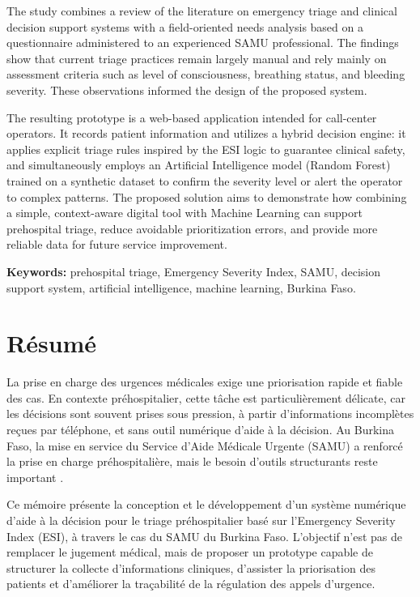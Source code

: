 \documentclass[a4paper,12pt,oneside]{report}
\begin{document}
The study combines a review of the literature on emergency triage and clinical decision support systems with a field-oriented needs analysis based on a questionnaire administered to an experienced SAMU professional. The findings show that current triage practices remain largely manual and rely mainly on assessment criteria such as level of consciousness, breathing status, and bleeding severity. These observations informed the design of the proposed system.

The resulting prototype is a web-based application intended for call-center operators. It records patient information and utilizes a hybrid decision engine: it applies explicit triage rules inspired by the ESI logic to guarantee clinical safety, and simultaneously employs an Artificial Intelligence model (Random Forest) trained on a synthetic dataset to confirm the severity level or alert the operator to complex patterns. The proposed solution aims to demonstrate how combining a simple, context-aware digital tool with Machine Learning can support prehospital triage, reduce avoidable prioritization errors, and provide more reliable data for future service improvement.

\vspace{0.5cm}
\noindent\textbf{Keywords:} prehospital triage, Emergency Severity Index, SAMU, decision support system, artificial intelligence, machine learning, Burkina Faso.

\clearpage

\section*{R\'esum\'e}
\justifying

La prise en charge des urgences m\'edicales exige une priorisation rapide et fiable des cas. En contexte pr\'ehospitalier, cette t\^ache est particuli\`erement d\'elicate, car les d\'ecisions sont souvent prises sous pression, \`a partir d'informations incompl\`etes re\c{c}ues par t\'el\'ephone, et sans outil num\'erique d'aide \`a la d\'ecision. Au Burkina Faso, la mise en service du Service d'Aide M\'edicale Urgente (SAMU) a renforc\'e la prise en charge pr\'ehospitali\`ere, mais le besoin d'outils structurants reste important \cite{ministry2024_urgences,ministry2024_garde}.

Ce m\'emoire pr\'esente la conception et le d\'eveloppement d'un syst\`eme num\'erique d'aide \`a la d\'ecision pour le triage pr\'ehospitalier bas\'e sur l'Emergency Severity Index (ESI), \`a travers le cas du SAMU du Burkina Faso. L'objectif n'est pas de remplacer le jugement m\'edical, mais de proposer un prototype capable de structurer la collecte d'informations cliniques, d'assister la priorisation des patients et d'am\'eliorer la tra\c{c}abilit\'e de la r\'egulation des appels d'urgence.
\end{document}
